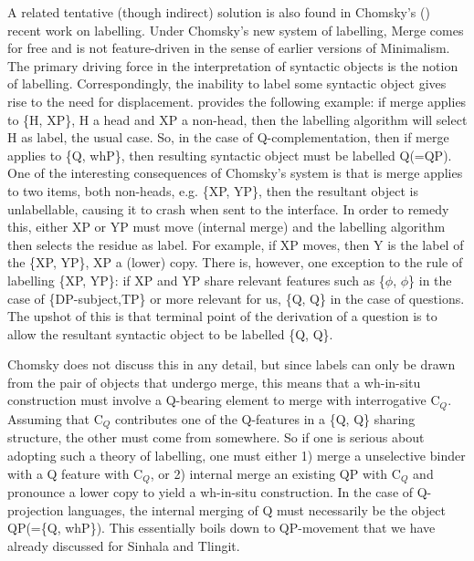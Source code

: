 \documentclass[charis]{glossa}
\begin{document}
A related tentative (though indirect) solution is also found in Chomsky's (\citeyear{chomsky:2013,chomsky:2015}) recent work on labelling. Under Chomsky's new system of labelling, Merge comes for free and is not feature-driven in the sense of earlier versions of Minimalism. The primary driving force in the interpretation of syntactic objects is the notion of labelling. Correspondingly, the inability to label some syntactic object gives rise to the need for displacement. \cite{chomsky:2013} provides the following example: if merge applies to \{H, XP\}, H a head and XP a non-head, then the labelling algorithm will select H as label, the usual case. So, in the case of Q-complementation, then if merge applies to \{Q, whP\}, then resulting syntactic object must be labelled Q(=QP). One of the interesting consequences of Chomsky's system is that is merge applies to two items, both non-heads, e.g. \{XP, YP\}, then the resultant object is unlabellable, causing it to crash when sent to the interface. In order to remedy this, either XP or YP must move (internal merge) and the labelling algorithm then selects the residue as label. For example, if XP moves, then Y is the label of the \{XP, YP\}, XP a (lower) copy. There is, however, one exception to the rule of labelling \{XP, YP\}: if XP and YP share relevant features such as \{$\phi$, $\phi$\} in the case of \{DP-subject,TP\} or more relevant for us, \{Q, Q\} in the case of questions. The upshot of this is that terminal point of the derivation of a question is to allow the resultant syntactic object to be labelled \{Q, Q\}.

Chomsky does not discuss this in any detail, but since labels can only be drawn from the pair of objects that undergo merge, this means that a wh-in-situ construction must involve a Q-bearing element to merge with interrogative C$_Q$. Assuming that C$_Q$ contributes one of the Q-features in a \{Q, Q\} sharing structure, the other must come from somewhere. So if one is serious about adopting such a theory of labelling, one must either 1) merge a unselective binder with a Q feature with C$_Q$, or 2) internal merge an existing QP with C$_Q$ and pronounce a lower copy to yield a wh-in-situ construction. In the case of Q-projection languages, the internal merging of Q must necessarily be the object QP(=\{Q, whP\}). This essentially boils down to QP-movement that we have already discussed for Sinhala and Tlingit.
\end{document}

